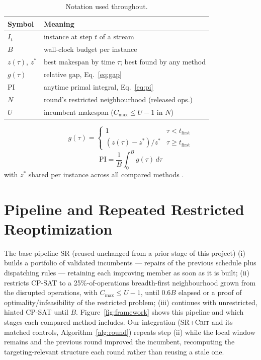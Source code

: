\documentclass[letterpaper]{article} %
\newcommand{\base}{\textsc{SR}}
\newcommand{\crit}{\textsc{SR+Crit}}
\begin{document}
\begin{table}[t]
\centering\small
\setlength{\tabcolsep}{4pt}
\begin{tabular}{ll}
\toprule
Symbol & Meaning \\
\midrule
$I_t$ & instance at step $t$ of a stream \\
$B$ & wall-clock budget per instance \\
$z(\tau)$, $z^*$ & best makespan by time $\tau$; best found by any method \\
$g(\tau)$ & relative gap, Eq.~\ref{eq:gap} \\
$\mathrm{PI}$ & anytime primal integral, Eq.~\ref{eq:pi} \\
$N$ & round's restricted neighbourhood (released ops.) \\
$U$ & incumbent makespan ($C_{\max}\le U{-}1$ in $N$) \\
\bottomrule
\end{tabular}
\caption{Notation used throughout.}
\label{tab:notation}
\end{table}

\begin{equation}
g(\tau) = \begin{cases} 1 & \tau < t_{\mathrm{first}} \\ (z(\tau)-z^*)/z^* & \tau \ge t_{\mathrm{first}} \end{cases}
\label{eq:gap}
\end{equation}
\begin{equation}
\mathrm{PI} = \frac{1}{B}\int_0^B g(\tau)\,d\tau
\label{eq:pi}
\end{equation}
with $z^*$ shared per instance across all compared methods \citep{berthold2013}.

\section{Pipeline and Repeated Restricted Reoptimization}
\label{sec:method}

The base pipeline \base{} (reused unchanged from a prior stage of this project) (i) builds a portfolio of validated incumbents --- repairs of the previous schedule plus dispatching rules --- retaining each improving member as soon as it is built; (ii) restricts CP-SAT to a 25\%-of-operations breadth-first neighbourhood grown from the disrupted operations, with $C_{\max}\le U-1$, until $0.6B$ elapsed or a proof of optimality/infeasibility of the restricted problem; (iii) continues with unrestricted, hinted CP-SAT until $B$. Figure~\ref{fig:framework} shows this pipeline and which stages each compared method includes. Our integration (\crit{} and its matched controls, Algorithm~\ref{alg:round}) repeats step (ii) while the local window remains and the previous round improved the incumbent, recomputing the targeting-relevant structure each round rather than reusing a stale one.
\end{document}
